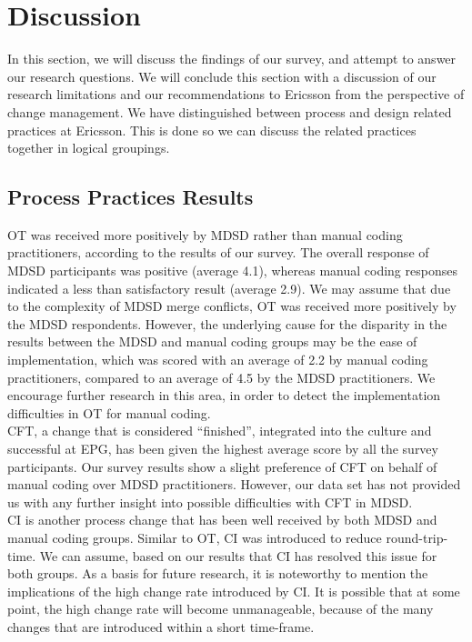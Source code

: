 \documentclass[final_report_innit.tex]{subfiles}
\begin{document}
\section{Discussion}

In this section, we will discuss the findings of our survey, and attempt to answer our research questions. We will conclude this section with a discussion of our research limitations and our recommendations to Ericsson from the perspective of change management. We have distinguished between process and design related practices at Ericsson. This is done so we can discuss the related practices together in logical groupings.

\subsection{Process Practices Results}

OT was received more positively by MDSD rather than manual coding practitioners, according to the results of our survey. The overall response of MDSD participants was positive (average 4.1), whereas manual coding responses indicated a less than satisfactory result (average 2.9). We may assume that due to the complexity of MDSD merge conflicts, OT was received more positively by the MDSD respondents. However, the underlying cause for the disparity in the results between the MDSD and manual coding groups may be the ease of implementation, which was scored with an average of 2.2 by manual coding practitioners, compared to an average of 4.5 by the MDSD practitioners. We encourage further research in this area, in order to detect the implementation difficulties in OT for manual coding.
\\

CFT, a change that is considered ``finished'', integrated into the culture and successful at EPG, has been given the highest average score by all the survey participants. Our survey results show a slight preference of CFT on behalf of manual coding over MDSD practitioners. However, our data set has not provided us with any further insight into possible difficulties with CFT in MDSD. 
\\

CI is another process change that has been well received by both MDSD and manual coding groups. Similar to OT, CI was introduced to reduce round-trip-time. We can assume, based on our results that CI has resolved this issue for both groups. As a basis for future research, it is noteworthy to mention the implications of the high change rate introduced by CI. It is possible that at some point, the high change rate will become unmanageable, because of the many changes that are introduced within a short time-frame.
\\
\end{document}
